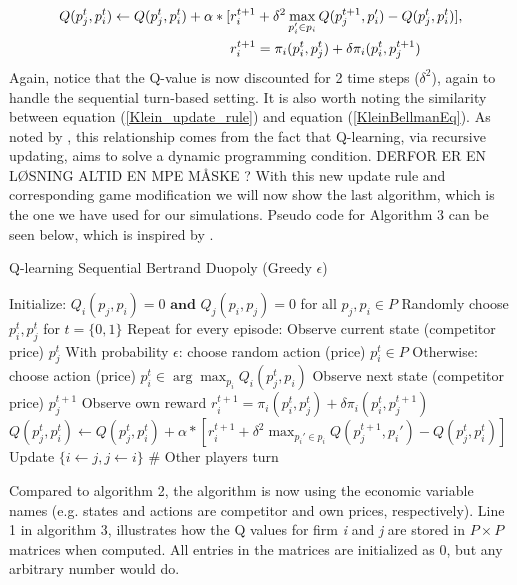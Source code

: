 \documentclass{article}
\begin{document}
\begin{align}
\label{Klein_update_rule}
Q(p_j^t,p_i^t)\leftarrow Q(p_j^t,p_i^t)+\alpha *[&r_i^{t+1}+\delta^2 \max_{p_i'\in p_i} Q(p_j^{t+1},p_i') -Q(p_j^t,p_i^t)], \\
&r_i^{t+1} = \pi_i(p^t_i,p^t_j)+\delta\pi_i(p_i^t,p_j^{t+1}) \notag 
\end{align}
Again, notice that the Q-value is now discounted for 2 time steps ($\delta^2$), again to handle the sequential turn-based setting.
\newline 
It is also worth noting the similarity between equation (\ref{Klein_update_rule}) and equation (\ref{KleinBellmanEq}). As noted by \cite{Klein2021}, this relationship comes from the fact that Q-learning, via recursive updating, aims to solve a dynamic programming condition. DERFOR ER EN LØSNING ALTID EN MPE  MÅSKE ?
\newline 
With this new update rule and corresponding game modification we will now show the last algorithm, which is the one we have used for our simulations. Pseudo code for Algorithm 3 can be seen below, which is inspired by \cite{Julius2023}.  
\begin{algorithm}[H]
\caption{Q-learning Sequential Bertrand Duopoly (Greedy $\epsilon$)}
\begin{algorithmic}[1]
\State Initialize: \( Q_i(p_j, p_i) = 0 \textbf{ and } Q_j(p_i, p_j) = 0 \) for all \( p_j, p_i \in P \)
\State Randomly choose \(p_i^t,p_j^t\) for \(t = \{0,1\}\) 
\State Repeat for every episode:
    \State Observe current state (competitor price) \( p_j^t \)
    \State With probability \( \epsilon \): choose random action (price) \( p_i^t \in P \)
    \State Otherwise: choose action (price)  \( p_i^t \in \arg \max_{p_i} Q_i(p_j^t, p_i) \)
    \State Observe next state (competitor price) \( p_j^{t+1} \)
    \State Observe own reward \(r_i^{t+1} = \pi_i(p^t_i,p^t_j)+\delta\pi_i(p_i^t,p_j^{t+1}) \) 
    \State \( Q(p_j^t,p_i^t)\gets Q(p_j^t,p_i^t)+\alpha *[r_i^{t+1}+\delta^2 \max_{p_i'\in p_i} Q(p_j^{t+1},p_i') -Q(p_j^t,p_i^t)]\)
    \State Update $\{i\leftarrow j,j\leftarrow i\}$ \# Other players turn
\EndFor
\end{algorithmic}
\end{algorithm}
Compared to algorithm 2, the algorithm is now using the economic variable names (e.g. states and actions are competitor and own prices, respectively).
Line 1 in algorithm 3, illustrates how the Q values for firm \textit{i} and \textit{j}  are stored in $P\times P$ matrices when computed. All entries in the matrices are initialized as 0, but any arbitrary number would do.
\end{document}
